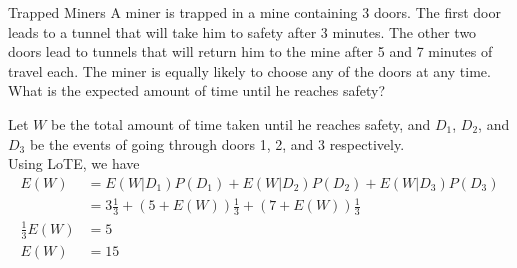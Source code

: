 \documentclass[11.5pt]{article}
\begin{document}
\begin{exercise}{Trapped Miners}
A miner is trapped in a mine containing 3 doors. The first door leads to a tunnel that will take him to safety after 3 minutes. The other two doors lead to tunnels that will return him to the mine after 5 and 7 minutes of travel each. The miner is equally likely to choose any of the doors at any time. What is the expected amount of time until he reaches safety?
\end{exercise}

\begin{solution}{4}
Let $W$ be the total amount of time taken until he reaches safety, and $D_1$, $D_2$, and $D_3$ be the events of going through doors 1, 2, and 3 respectively. \\
Using LoTE, we have
\begin{align*}
E(W) &= E(W|D_1)P(D_1) + E(W|D_2)P(D_2) + E(W|D_3)P(D_3) \\
&= 3 \frac{1}{3} + (5 + E(W)) \frac{1}{3} + (7 + E(W)) \frac{1}{3} \\
\frac{1}{3} E(W) &= 5 \\
E(W) &= 15
\end{align*}
\end{solution}
\end{document}
